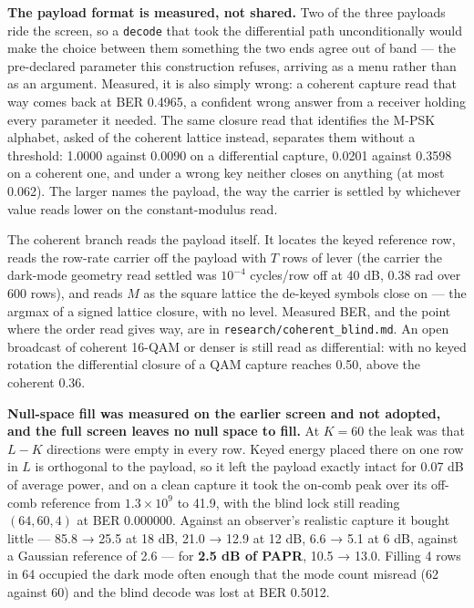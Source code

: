 \documentclass[10pt,letterpaper,twocolumn]{article}
\begin{document}
\textbf{The payload format is measured, not shared.} Two of the three payloads ride the screen, so a \texttt{decode} that took the differential path unconditionally would make the choice between them something the two ends agree out of band --- the pre-declared parameter this construction refuses, arriving as a menu rather than as an argument. Measured, it is also simply wrong: a coherent capture read that way comes back at BER 0.4965, a confident wrong answer from a receiver holding every parameter it needed. The same closure read that identifies the M-PSK alphabet, asked of the coherent lattice instead, separates them without a threshold: 1.0000 against 0.0090 on a differential capture, 0.0201 against 0.3598 on a coherent one, and under a wrong key neither closes on anything (at most 0.062). The larger names the payload, the way the carrier is settled by whichever value reads lower on the constant-modulus read.

The coherent branch reads the payload itself. It locates the keyed reference row, reads the row-rate carrier off the payload with \(T\) rows of lever (the carrier the dark-mode geometry read settled was \(10^{-4}\) cycles/row off at 40 dB, 0.38 rad over 600 rows), and reads \(M\) as the square lattice the de-keyed symbols close on --- the argmax of a signed lattice closure, with no level. Measured BER, and the point where the order read gives way, are in \texttt{research/\allowbreak{}coherent\_\allowbreak{}blind.\allowbreak{}md}. An open broadcast of coherent 16-QAM or denser is still read as differential: with no keyed rotation the differential closure of a QAM capture reaches 0.50, above the coherent 0.36.

\textbf{Null-space fill was measured on the earlier screen and not adopted, and the full screen leaves no null space to fill.} At \(K = 60\) the leak was that \(L-K\) directions were empty in every row. Keyed energy placed there on one row in \(L\) is orthogonal to the payload, so it left the payload exactly intact for 0.07 dB of average power, and on a clean capture it took the on-comb peak over its off-comb reference from \(1.3\times10^{9}\) to 41.9, with the blind lock still reading \((64, 60, 4)\) at BER 0.000000. Against an observer's realistic capture it bought little --- 85.8 → 25.5 at 18 dB, 21.0 → 12.9 at 12 dB, 6.6 → 5.1 at 6 dB, against a Gaussian reference of 2.6 --- for \textbf{2.5 dB of PAPR}, 10.5 → 13.0. Filling 4 rows in 64 occupied the dark mode often enough that the mode count misread (62 against 60) and the blind decode was lost at BER 0.5012.
\end{document}
